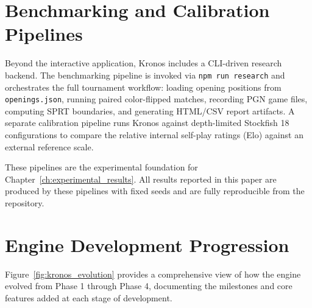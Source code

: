 

\section{Benchmarking and Calibration Pipelines}
Beyond the interactive application, Kronos includes a CLI-driven research backend. The benchmarking pipeline is invoked via \texttt{npm run research} and orchestrates the full tournament workflow: loading opening positions from \texttt{openings.json}, running paired color-flipped matches, recording PGN game files, computing SPRT boundaries, and generating HTML/CSV report artifacts. A separate calibration pipeline runs Kronos against depth-limited Stockfish 18 configurations to compare the relative internal self-play ratings (Elo) against an external reference scale.

These pipelines are the experimental foundation for Chapter~\ref{ch:experimental_results}. All results reported in this paper are produced by these pipelines with fixed seeds and are fully reproducible from the repository.

\section{Engine Development Progression}
Figure~\ref{fig:kronos_evolution} provides a comprehensive view of how the engine evolved from Phase 1 through Phase 4, documenting the milestones and core features added at each stage of development.


